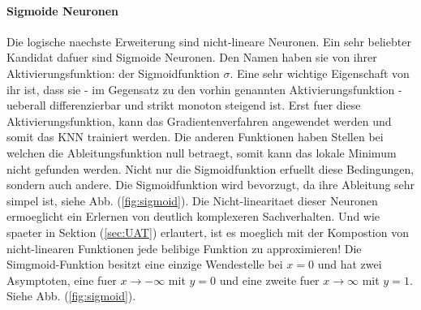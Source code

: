 \documentclass[../main]{subfiles}
\begin{document}
\paragraph{Sigmoide Neuronen}
Die logische naechste Erweiterung sind nicht-lineare Neuronen.
Ein sehr beliebter Kandidat dafuer sind Sigmoide Neuronen.
Den Namen haben sie von ihrer Aktivierungsfunktion: der Sigmoidfunktion $\sigma$.
Eine sehr wichtige Eigenschaft von ihr ist, dass sie - im Gegensatz zu den vorhin
genannten Aktivierungsfunktion - ueberall differenzierbar und strikt monoton
steigend ist. Erst fuer diese Aktivierungsfunktion, kann das Gradientenverfahren
angewendet werden und somit das KNN trainiert werden. Die anderen
Funktionen haben Stellen bei welchen die Ableitungsfunktion null
betraegt, somit kann das lokale Minimum nicht gefunden werden.
Nicht nur die Sigmoidfunktion erfuellt diese Bedingungen, sondern auch andere. Die Sigmoidfunktion wird
bevorzugt, da ihre Ableitung sehr simpel ist, siehe Abb. (\ref{fig:sigmoid}).
Die Nicht-linearitaet dieser Neuronen ermoeglicht ein Erlernen von deutlich komplexeren Sachverhalten.
Und wie spaeter in Sektion (\ref{sec:UAT}) erlautert, ist es moeglich mit der Kompostion von nicht-linearen
Funktionen jede belibige Funktion zu approximieren!
\para
Die Simgmoid-Funktion besitzt eine einzige Wendestelle bei $x=0$ und hat zwei Asymptoten, eine fuer $x \to -\infty$ mit $y=0$
und eine zweite fuer $x \to\infty$ mit $y=1$. Siehe Abb. (\ref{fig:sigmoid}).
\end{document}
